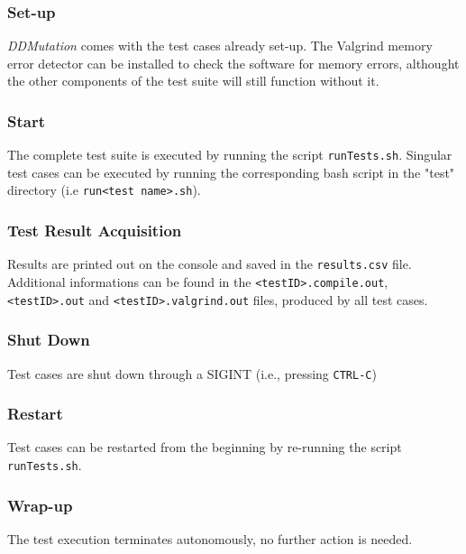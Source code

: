 \subsubsection{Set-up}
\emph{DDMutation} comes with the test cases already set-up.  The Valgrind memory error detector can be installed to check the software for memory errors, althought the other components of the test suite will still function without it.
\subsubsection{Start}
The complete test suite is executed by running the script \texttt{runTests.sh}.
Singular test cases can be executed by running the corresponding bash script in the "test" directory (i.e \texttt{run<test name>.sh}).
\subsubsection{Test Result Acquisition}
Results are printed out on the console and saved in the \texttt{results.csv} file.
Additional informations can be found in the \texttt{<testID>.compile.out}, 
\texttt{<testID>.out} and \texttt{<testID>.valgrind.out} files, produced by all test cases.
\subsubsection{Shut Down}
Test cases are shut down through a SIGINT (i.e., pressing \texttt{CTRL-C})
\subsubsection{Restart}
Test cases can be restarted from the beginning by re-running the script \texttt{runTests.sh}.
\subsubsection{Wrap-up}
The test execution terminates autonomously, no further action is needed.
